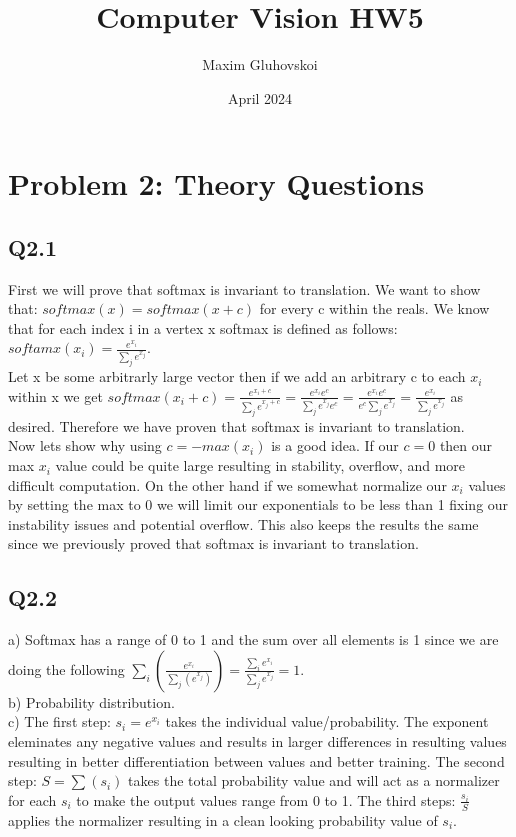 \documentclass{article}
\title{Computer Vision HW5}
\author{Maxim Gluhovskoi}
\date{April 2024}
\begin{document}
\maketitle
\newpage
\section*{Problem 2: Theory Questions}

\subsection*{Q2.1}
\begin{flushleft}
    First we will prove that softmax is invariant to translation. We want to show that: 
    $softmax(x)=softmax(x+c)$ for every c within the reals. We know that for each index i in a vertex x 
    softmax is defined as follows: $softamx(x_i)=\frac{e^{x_i}}{\sum_{j}e^{x_j}}$. \\
    Let x be some arbitrarly large vector then if we add an arbitrary c to each $x_i$ within x we 
    get $softmax(x_i+c)=\frac{e^{x_i+c}}{\sum_{j}e^{x_j+c}}=\frac{e^{x_i}e^{c}}{\sum_{j}e^{x_j}e^{c}}
    =\frac{e^{x_i}e^{c}}{e^{c}\sum_{j}e^{x_j}}=\frac{e^{x_i}}{\sum_{j}e^{x_j}}$ as desired. Therefore 
    we have proven that softmax is invariant to translation.\\
    Now lets show why using $c=-max(x_i)$ is a good idea. If our $c=0$ then our max $x_i$ value could 
    be quite large resulting in stability, overflow, and more difficult computation. On the other 
    hand if we somewhat normalize our $x_i$ values by setting the max to 0 we will limit our 
    exponentials to be less than 1 fixing our instability issues and potential overflow. This also 
    keeps the results the same since we previously proved that softmax is invariant to translation.

\end{flushleft}
\subsection*{Q2.2}
\begin{flushleft}
    a) Softmax has a range of 0 to 1 and the sum over all elements is 1 since we 
    are doing the following $\sum_{i}(\frac{e^{x_i}}{\sum_{j}(e^{x_j})})=
    \frac{\sum_{i}e^{x_i}}{\sum_{j}e^{x_j}}=1$.\\
    b) Probability distribution.\\
    c) The first step: $s_i=e^{x_i}$ takes the individual value/probability. The exponent 
    eleminates any negative values and results in larger differences in resulting values resulting 
    in better differentiation between values and better training. The second step: $S=\sum(s_i)$ 
    takes the total probability value and will act as a normalizer for each $s_i$ to make the output
    values range from 0 to 1. The third steps: $\frac{s_i}{S}$ applies the normalizer resulting in 
    a clean looking probability value of $s_i$.
\end{flushleft}
\end{document}
